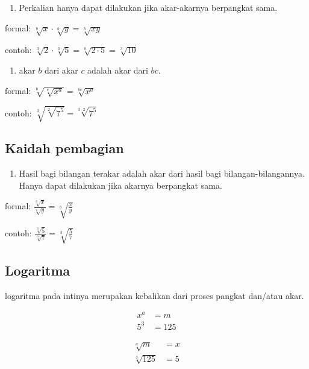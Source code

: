 \documentclass[
  letterpaper,
  DIV=11,
  numbers=noendperiod]{scrartcl}
\providecommand{\tightlist}{%
  \setlength{\itemsep}{0pt}\setlength{\parskip}{0pt}}\usepackage{longtable,booktabs,array}
\begin{document}
\begin{enumerate}
\def\labelenumi{\arabic{enumi}.}
\setcounter{enumi}{4}
\tightlist
\item
  Perkalian hanya dapat dilakukan jika akar-akarnya berpangkat sama.
\end{enumerate}

formal: \(\sqrt[b]{x} \cdot \sqrt[b]{y}=\sqrt[b]{xy}\)

contoh:
\(\sqrt[3]{2} \cdot \sqrt[3]{5}=\sqrt[b]{2 \cdot 5}=\sqrt[3]{10}\)

\begin{enumerate}
\def\labelenumi{\arabic{enumi}.}
\setcounter{enumi}{5}
\tightlist
\item
  akar \(b\) dari akar \(c\) adalah akar dari \(bc\).
\end{enumerate}

formal: \(\sqrt[b]{\sqrt[c]{x^a}}=\sqrt[bc]{x^a}\)

contoh: \(\sqrt[3]{\sqrt[2]{7^5}}=\sqrt[3 \cdot 2]{7^5}\)

\hypertarget{kaidah-pembagian}{%
\subsection{Kaidah pembagian}\label{kaidah-pembagian}}

\begin{enumerate}
\def\labelenumi{\arabic{enumi}.}
\setcounter{enumi}{7}
\tightlist
\item
  Hasil bagi bilangan terakar adalah akar dari hasil bagi
  bilangan-bilangannya. Hanya dapat dilakukan jika akarnya berpangkat
  sama.
\end{enumerate}

formal: \(\frac{\sqrt[b]{x}}{\sqrt[b]{y}}=\sqrt[b]{\frac{x}{y}}\)

contoh: \(\frac{\sqrt[3]{5}}{\sqrt[3]{7}}=\sqrt[3]{\frac{5}{7}}\)

\hypertarget{logaritma}{%
\subsection{Logaritma}\label{logaritma}}

logaritma pada intinya merupakan kebalikan dari proses pangkat dan/atau
akar.

\[
\begin{align}
x^a &= m \\
5^3 &= 125
\end{align}
\]

\[
\begin{align}
\sqrt[a]{m} &= x \\
\sqrt[3]{125} &= 5
\end{align}
\]
\end{document}
